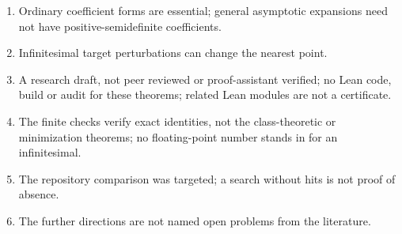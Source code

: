 \documentclass[11pt,oneside]{article}
\numberwithin{equation}{section}
\theoremstyle{definition}
\theoremstyle{remark}
\begin{document}
\begin{enumerate}[leftmargin=*,widest=00,label=10.\arabic*]
\item Ordinary coefficient forms are essential; general asymptotic expansions need
not have positive-semidefinite coefficients.
\item Infinitesimal target perturbations can change the nearest point.
\item A research draft, not peer reviewed or proof-assistant verified; no Lean
code, build or audit for these theorems; related Lean modules are not a
certificate.
\item The finite checks verify exact identities, not the class-theoretic or
minimization theorems; no floating-point number stands in for an infinitesimal.
\item The repository comparison was targeted; a search without hits is not proof
of absence.
\item The further directions are not named open problems from the literature.
\end{enumerate}
\end{document}
